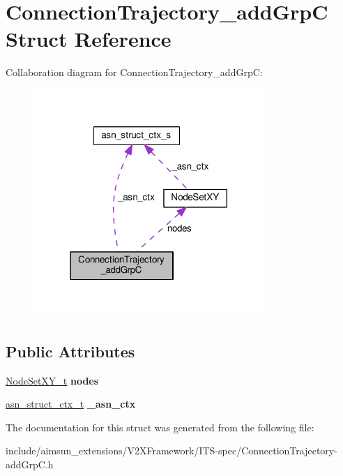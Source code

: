 \hypertarget{structConnectionTrajectory__addGrpC}{}\section{Connection\+Trajectory\+\_\+add\+GrpC Struct Reference}
\label{structConnectionTrajectory__addGrpC}


Collaboration diagram for Connection\+Trajectory\+\_\+add\+GrpC\+:\nopagebreak
\begin{figure}[H]
\begin{center}
\leavevmode
\includegraphics[width=248pt]{structConnectionTrajectory__addGrpC__coll__graph}
\end{center}
\end{figure}
\subsection*{Public Attributes}
\begin{DoxyCompactItemize}
\item 
\hyperlink{structNodeSetXY}{Node\+Set\+X\+Y\+\_\+t} {\bfseries nodes}\hypertarget{structConnectionTrajectory__addGrpC_a49fda3ad4b77eb87faab77a9be25fc3b}{}\label{structConnectionTrajectory__addGrpC_a49fda3ad4b77eb87faab77a9be25fc3b}

\item 
\hyperlink{structasn__struct__ctx__s}{asn\+\_\+struct\+\_\+ctx\+\_\+t} {\bfseries \+\_\+asn\+\_\+ctx}\hypertarget{structConnectionTrajectory__addGrpC_a08e881b81b80c97221f4301f34347ca6}{}\label{structConnectionTrajectory__addGrpC_a08e881b81b80c97221f4301f34347ca6}

\end{DoxyCompactItemize}


The documentation for this struct was generated from the following file\+:\begin{DoxyCompactItemize}
\item 
include/aimsun\+\_\+extensions/\+V2\+X\+Framework/\+I\+T\+S-\/spec/Connection\+Trajectory-\/add\+Grp\+C.\+h\end{DoxyCompactItemize}
